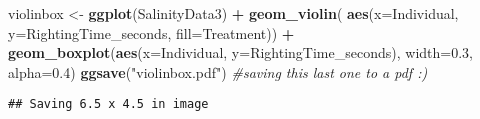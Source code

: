 \documentclass[
]{article}
\newenvironment{Shaded}{\begin{snugshade}}{\end{snugshade}}
\newcommand{\CommentTok}[1]{\textcolor[rgb]{0.56,0.35,0.01}{\textit{#1}}}
\newcommand{\DataTypeTok}[1]{\textcolor[rgb]{0.13,0.29,0.53}{#1}}
\newcommand{\FloatTok}[1]{\textcolor[rgb]{0.00,0.00,0.81}{#1}}
\newcommand{\KeywordTok}[1]{\textcolor[rgb]{0.13,0.29,0.53}{\textbf{#1}}}
\newcommand{\NormalTok}[1]{#1}
\newcommand{\OperatorTok}[1]{\textcolor[rgb]{0.81,0.36,0.00}{\textbf{#1}}}
\newcommand{\StringTok}[1]{\textcolor[rgb]{0.31,0.60,0.02}{#1}}
\begin{document}
\begin{Shaded}
\begin{Highlighting}[]
\NormalTok{violinbox <-}\StringTok{ }\KeywordTok{ggplot}\NormalTok{(SalinityData3) }\OperatorTok{+}\StringTok{ }\KeywordTok{geom_violin}\NormalTok{(}
  \KeywordTok{aes}\NormalTok{(}\DataTypeTok{x=}\NormalTok{Individual, }\DataTypeTok{y=}\NormalTok{RightingTime_seconds, }
    \DataTypeTok{fill=}\NormalTok{Treatment)) }\OperatorTok{+}\StringTok{ }\KeywordTok{geom_boxplot}\NormalTok{(}\KeywordTok{aes}\NormalTok{(}\DataTypeTok{x=}\NormalTok{Individual, }
                                        \DataTypeTok{y=}\NormalTok{RightingTime_seconds),}
                                        \DataTypeTok{width=}\FloatTok{0.3}\NormalTok{, }
                                        \DataTypeTok{alpha=}\FloatTok{0.4}\NormalTok{)}
\KeywordTok{ggsave}\NormalTok{(}\StringTok{"violinbox.pdf"}\NormalTok{) }\CommentTok{#saving this last one to a pdf :) }
\end{Highlighting}
\end{Shaded}

\begin{verbatim}
## Saving 6.5 x 4.5 in image
\end{verbatim}
\end{document}

